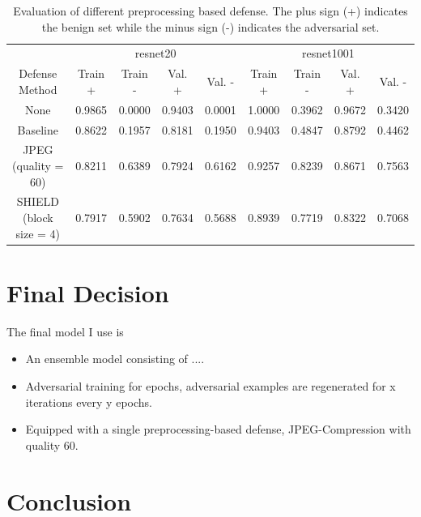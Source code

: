 \documentclass{article}
\begin{document}
\begin{table}
  \label{experiment:pgd-iterations}
  \centering
  \caption{Evaluation of different preprocessing based defense. The plus sign (+) indicates the
    benign set while the minus sign (-) indicates the adversarial set.}
  \begin{tabular}{ccccccccc}
    \toprule
    & \multicolumn{4}{c}{resnet20} & \multicolumn{4}{c}{resnet1001} \\
    \cmidrule(r){2-5} \cmidrule(r){6-9}
    Defense Method            & Train + & Train - & Val. +  & Val. -  & Train + & Train - & Val. +  & Val. -  \\
    \midrule
    None                      & 0.9865  & 0.0000  & 0.9403  & 0.0001  & 1.0000  & 0.3962  & 0.9672  & 0.3420  \\
    Baseline                  & 0.8622  & 0.1957  & 0.8181  & 0.1950  & 0.9403  & 0.4847  & 0.8792  & 0.4462  \\
    JPEG (quality = 60)       & 0.8211  & 0.6389  & 0.7924  & 0.6162  & 0.9257  & 0.8239  & 0.8671  & 0.7563  \\
    SHIELD (block size = 4)   & 0.7917  & 0.5902  & 0.7634  & 0.5688  & 0.8939  & 0.7719  & 0.8322  & 0.7068  \\
    \bottomrule
  \end{tabular}
\end{table}


\section{Final Decision}
The final model I use is

\begin{itemize}
  \item An ensemble model consisting of ....
  \item Adversarial training for epochs, adversarial examples are regenerated for x iterations every
  y epochs.
  \item Equipped with a single preprocessing-based defense, JPEG-Compression with quality 60.
\end{itemize}

\section{Conclusion}



\end{document}
